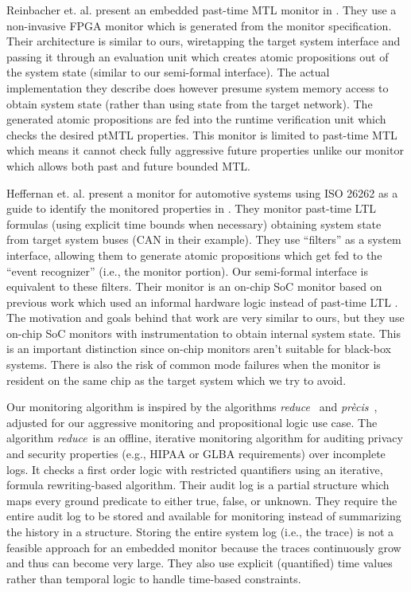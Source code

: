 \documentclass[]{../llncs/llncs}
\newcommand{\precis}{\textit{pr\`ecis}}
\newcommand{\greduce}{\textit{reduce}}
\begin{document}
Reinbacher et. al. present an embedded past-time MTL monitor in \cite{Reinbacher2013}. They use a non-invasive FPGA monitor which is generated from the monitor specification. Their architecture is similar to ours, wiretapping the target system interface and passing it through an evaluation unit which creates atomic propositions out of the system state (similar to our semi-formal interface). The actual implementation they describe does however presume system memory access to obtain system state (rather than using state from the target network). The generated atomic propositions are fed into the runtime verification unit which checks the desired ptMTL properties. This monitor is limited to past-time MTL which means it cannot check fully aggressive future properties unlike our monitor which allows both past and future bounded MTL.

Heffernan et. al. present a monitor for automotive systems using ISO 26262 as a guide to identify the monitored properties in \cite{Heffernan2014}. They monitor past-time LTL formulas (using explicit time bounds when necessary) obtaining system state from target system buses (CAN in their example). They use ``filters'' as a system interface, allowing them to generate atomic propositions which get fed to the ``event recognizer'' (i.e., the monitor portion). Our semi-formal interface is equivalent to these filters. 
Their monitor is an on-chip SoC monitor based on previous work which used an informal hardware logic instead of past-time LTL \cite{Heffernan2009}.
%
The motivation and goals behind that work are very similar to ours, but they use on-chip SoC monitors with instrumentation to obtain internal system state. This is an important distinction since on-chip monitors aren't suitable for black-box systems. There is also the risk of common mode failures when the monitor is resident on the same chip as the target system which we try to avoid.

Our monitoring algorithm is inspired by the algorithms \greduce\ \cite{Garg2011} and \precis\ \cite{Chowdhury2014}, adjusted for our aggressive monitoring and propositional logic use case. 
%
The algorithm \greduce\ is an offline, iterative monitoring algorithm for auditing privacy and security properties (e.g., HIPAA \cite{HIPAA2002} or GLBA \cite{GLBA1999} requirements) over incomplete logs. It checks a first order logic with restricted quantifiers \cite{Garg2011} using an iterative, formula rewriting-based algorithm.
Their audit log is a partial structure which maps every ground predicate to either true, false, or unknown.
They require the entire audit log to be stored and available for monitoring instead of summarizing the history in a structure.
Storing the entire system log (i.e., the trace) is not a feasible approach for an embedded monitor because the traces continuously grow and thus can become very large.
%
They also use explicit (quantified) time values rather than temporal logic to handle time-based constraints. 
\end{document}
